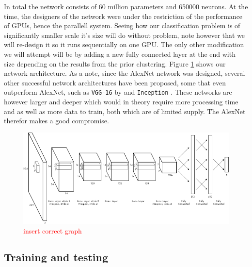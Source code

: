 In total the network consists of 60 million parameters and 650000 neurons. At the time, the designers of the network were under the restriction of the performance of GPUs, hence the parallell system. Seeing how our classification problem is of significantly smaller scale it's size will do without problem, note however that we will re-design it so it runs sequentially on one GPU. The only other modification we will attempt will be by adding a new fully connected layer at the end with size depending on the results from the prior clustering. Figure \ref{fig:method_cnn_arch} shows our network architecture. As a note, since the AlexNet network was designed, several other successful network architectures have been proposed, some that even outperform AlexNet, such as \texttt{VGG-16} by \textcite{Arge2015} and \texttt{Inception} \textcite{Szegedy2014}. These networks are however larger and deeper which would in theory require more processing time and as well as more data to train, both which are of limited supply. The AlexNet therefor makes a good compromise.

\begin{figure}
	\centering
	\includegraphics[width=\textwidth]{img/related-work/cnn-architecture.png}
	\caption{\textcolor{red}{insert correct graph}}
	\label{fig:method_cnn_arch}
\end{figure}

\subsection{Training and testing}

